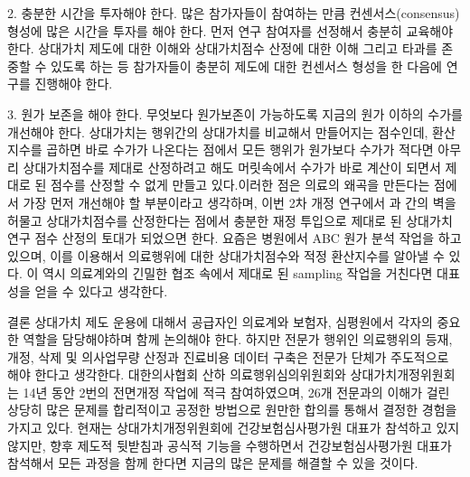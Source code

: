 2. 충분한 시간을 투자해야 한다.
많은 참가자들이 참여하는 만큼 컨센서스(consensus) 형성에 많은 시간을 투자를 해야 한다. 먼저 연구 참여자를 선정해서 충분히 교육해야 한다. 상대가치 제도에 대한 이해와 상대가치점수 산정에 대한 이해 그리고 타과를 존중할 수 있도록 하는 등 참가자들이 충분히 제도에 대한 컨센서스 형성을 한 다음에 연구를 진행해야 한다.

3. 원가 보존을 해야 한다.
무엇보다 원가보존이 가능하도록 지금의 원가 이하의 수가를 개선해야 한다. 상대가치는 행위간의 상대가치를 비교해서 만들어지는 점수인데, 환산지수를 곱하면 바로 수가가 나온다는 점에서 모든 행위가 원가보다 수가가 적다면 아무리 상대가치점수를 제대로 산정하려고 해도 머릿속에서 수가가 바로 계산이 되면서 제대로 된 점수를 산정할 수 없게 만들고 있다.이러한 점은 의료의 왜곡을 만든다는 점에서 가장 먼저 개선해야 할 부분이라고 생각하며, 이번 2차 개정 연구에서 과 간의 벽을 허물고 상대가치점수를 산정한다는 점에서 충분한 재정 투입으로 제대로 된 상대가치 연구 점수 산정의 토대가 되었으면 한다. 요즘은 병원에서 ABC 원가 분석 작업을 하고 있으며, 이를 이용해서 의료행위에 대한 상대가치점수와 적정 환산지수를 알아낼 수 있다. 이 역시 의료계와의 긴밀한 협조 속에서 제대로 된 sampling 작업을 거친다면 대표성을 얻을 수 있다고 생각한다. 

결론
상대가치 제도 운용에 대해서 공급자인 의료계와 보험자, 심평원에서 각자의 중요한 역할을 담당해야하며 함께 논의해야 한다. 하지만 전문가 행위인 의료행위의 등재, 개정, 삭제 및 의사업무량 산정과 진료비용 데이터 구축은 전문가 단체가 주도적으로 해야 한다고 생각한다. 대한의사협회 산하 의료행위심의위원회와 상대가치개정위원회는 14년 동안 2번의 전면개정 작업에 적극 참여하였으며, 26개 전문과의 이해가 걸린 상당히 많은 문제를 합리적이고 공정한 방법으로 원만한 합의를 통해서 결정한 경험을 가지고 있다. 현재는 상대가치개정위원회에 건강보험심사평가원 대표가 참석하고 있지 않지만, 향후 제도적 뒷받침과 공식적 기능을 수행하면서 건강보험심사평가원 대표가 참석해서 모든 과정을 함께 한다면 지금의 많은 문제를 해결할 수 있을 것이다.

